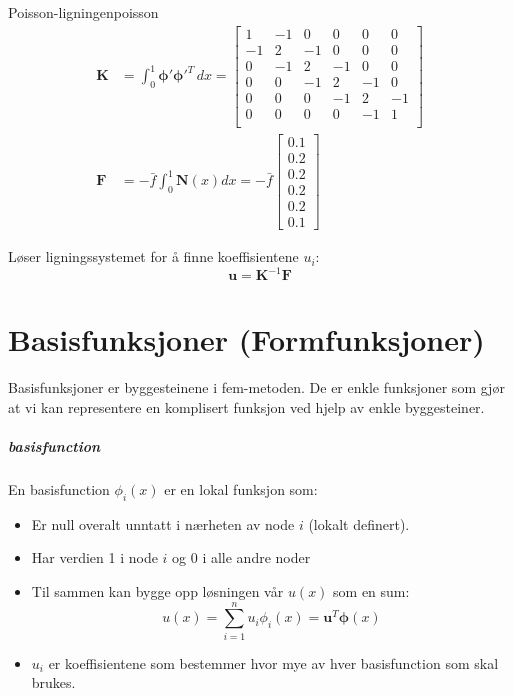\begin{example}{Poisson-ligningen}{poisson}
  \begin{align*}
    \symbf{K} &= \int_0^1 \symbf{\phi}' \symbf{\phi}'^T \, dx = 
    \begin{bmatrix}
      1 & -1 & 0 & 0 & 0 & 0 \\
      -1 & 2 & -1 & 0 & 0 & 0 \\
      0 & -1 & 2 & -1 & 0 & 0 \\
      0 & 0 & -1 & 2 & -1 & 0 \\
      0 & 0 & 0 & -1 & 2 & -1 \\
      0 & 0 & 0 & 0 & -1 & 1 \\
    \end{bmatrix}\\
    \symbf{F} &= - \bar{f} \int_0^1 \symbf{N}(x) dx
    = - \bar{f}
    \begin{bmatrix}
      0.1 \\ 0.2 \\ 0.2 \\ 0.2 \\ 0.2 \\ 0.1
    \end{bmatrix}
  \end{align*}

  Løser ligningssystemet for å finne koeffisientene \(u_i\):
  \[
    \symbf{u} = \symbf{K}^{-1} \symbf{F}
  \]

\end{example}

\section{Basisfunksjoner (Formfunksjoner)}

Basisfunksjoner er byggesteinene i \gls{fem}-metoden.
De er enkle funksjoner som gjør at vi kan representere en komplisert funksjon ved hjelp av enkle byggesteiner.

\subparagraph{\gls{basisfunction}}
En \gls{basisfunction} $\phi_i(x)$ er en lokal funksjon som:
\begin{itemize}
  \item Er null overalt unntatt i nærheten av node \(i\) (lokalt definert).
  \item Har verdien 1 i node \(i\) og 0 i alle andre noder
  \item Til sammen kan bygge opp løsningen vår \(u(x)\) som en sum:
        \[
          u(x) = \sum_{i=1}^n u_i \phi_i(x) = \symbf{u}^T \symbf{\phi}(x)
        \]
  \item \(u_i\) er koeffisientene som bestemmer hvor mye av hver \gls{basisfunction} som skal brukes.
\end{itemize}


